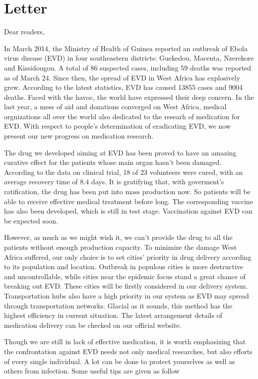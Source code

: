 \section{Letter}
Dear readers,

In March 2014, the Ministry of Health of Guinea reported an outbreak of Ebola virus disease (EVD) in four southeastern districts: Guekedou, Macenta, Nzerekore and Kissidougou. A total of 86 suspected cases, including 59 deaths was reported as of March 24. Since then, the spread of EVD in West Africa has explosively grew. According to the latest statistics, EVD has caused 13855 cases and 9004 deaths. Faced with the havoc, the world have expressed their deep concern. In the last year, a mess of aid and donations converged on West Africa, medical orgnizations all over the world also dedicated to the researh of medication for EVD. With respect to people's determination of eradicating EVD, we now present our new progress on medication research.


The drug we developed aiming at EVD has been proved to have an amazing curative effect for the patients whose main organ hasn't been damaged. According to the data on clinical trial, 18 of 23 volunteers were cured, with an average recovery time of 8.4 days. It is gratifying that, with goverment's ratification, the drug has been put into mass production now. So patients will be able to receive effective medical treatment before long. The corresponding vaccine has also been developed, which is still in test stage. Vaccination against EVD can be expected soon.


However, as much as we might wish it, we can't provide the drug to all the patients without enough production capacity. To minimize the damage West Africa suffered, our only choice is to set cities' priority in drug delivery according to its population and location. Outbreak in populous cities is more destructive and uncontrollable, while cities near the epidemic focus stand a great chance of breaking out EVD. These cities will be firstly considered in our delivery system. Transportation hubs also have a high priority in our system as EVD may spread through transportation networks. Glacial as it sounds, this method has the highest efficiency in current situation. The latest arrangement details of medication delivery can be checked on our official website. 

Though we are still in lack of effective medication, it is worth emphasizing that the confrontation against EVD needs not only medical researches, but also efforts of every single individual. A lot can be done to protect yourselves as well as others from infection. Some useful tips are given as follow

